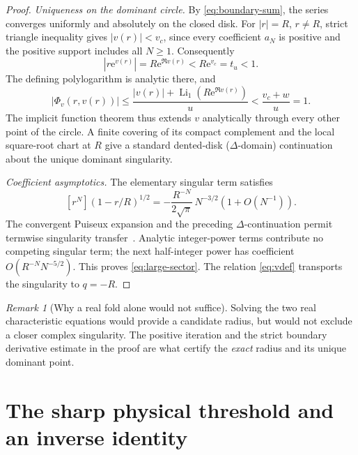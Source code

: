 \documentclass[11pt,a4paper]{article}
\theoremstyle{definition}\newtheorem{definition}[theorem]{Definition}
\theoremstyle{remark}\newtheorem{remark}[theorem]{Remark}
\newcommand{\Li}{\operatorname{Li}}
\newcommand{\ee}{\mathrm e}
\numberwithin{equation}{section}
\begin{document}
\begin{proof}
\emph{Uniqueness on the dominant circle.}
By \eqref{eq:boundary-sum}, the series converges uniformly and absolutely
on the closed disk. For $|r|=R$, $r\ne R$, strict triangle inequality gives
$|v(r)|<v_c$, since every coefficient $a_N$ is positive and the positive
support includes all $N\ge1$. Consequently
\[
 |r\ee^{v(r)}|=R\ee^{\Re v(r)}<R\ee^{v_c}=t_u<1.
\]
The defining polylogarithm is analytic there, and
\[
 |\Phi_v(r,v(r))|
 \le\frac{|v(r)|+\Li_1(R\ee^{\Re v(r)})}u
 <\frac{v_c+w}u=1.
\]
The implicit function theorem thus extends $v$ analytically through every
other point of the circle. A finite covering of its compact complement
and the local square-root chart at $R$ give a standard dented-disk
($\Delta$-domain) continuation about the unique dominant singularity.

\emph{Coefficient asymptotics.}
The elementary singular term satisfies
\[
 [r^N](1-r/R)^{1/2}
   =-\frac{R^{-N}}{2\sqrt\pi}\,N^{-3/2}(1+O(N^{-1})).
\]
The convergent Puiseux expansion and the preceding $\Delta$-continuation
permit termwise singularity transfer~\cite{FO}. Analytic integer-power
terms contribute no competing singular term; the next half-integer
power has coefficient $O(R^{-N}N^{-5/2})$. This proves
\eqref{eq:large-sector}. The relation \eqref{eq:vdef} transports the
singularity to $q=-R$.
\end{proof}

\begin{remark}[Why a real fold alone would not suffice]
Solving the two real characteristic equations would provide a candidate
radius, but would not exclude a closer complex singularity. The positive
iteration and the strict boundary derivative estimate in the proof are
what certify the \emph{exact} radius and its unique dominant point.
\end{remark}

\section{The sharp physical threshold and an inverse identity}\label{sec:physical}
\end{document}
